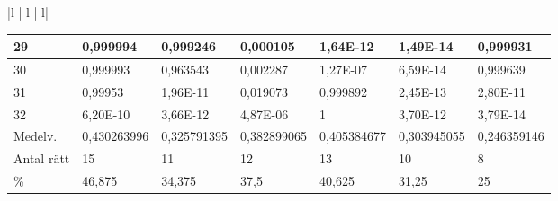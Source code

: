 \documentclass[a4paper,10pt]{article}
\begin{document}
{\begin{tabular}{ |l | l | l| }
\begin{centering}
\begin{centering}
{\begin{tabular}{ |l|l|l|l|l|l|l| }
29	        & 0,999994 & 0,999246 & 0,000105 & 1,64E-12 & 1,49E-14 & 0,999931 \\ \hline                      
30	        & 0,999993 & 0,963543 & 0,002287 & 1,27E-07 & 6,59E-14 & 0,999639 \\ \hline                      
31	        & 0,99953  & 1,96E-11 & 0,019073 & 0,999892 & 2,45E-13 & 2,80E-11 \\ \hline                    
32	        & 6,20E-10 & 3,66E-12 & 4,87E-06 & 1        & 3,70E-12 & 3,79E-14 \\ \hline\hline               
Medelv.    &  0,430263996 & 0,325791395 & 0,382899065 & 0,405384677 & 0,303945055 & 0,246359146 \\ \hline
Antal rätt &  15 & 11 & 12 & 13 & 10 & 8 \\ \hline
\%		   &  46,875 & 34,375 & 37,5 & 40,625 & 31,25 & 25 \\ \hline
\end{tabular}
}



\end{centering}
\end{centering}
\end{tabular}}
\end{document}
